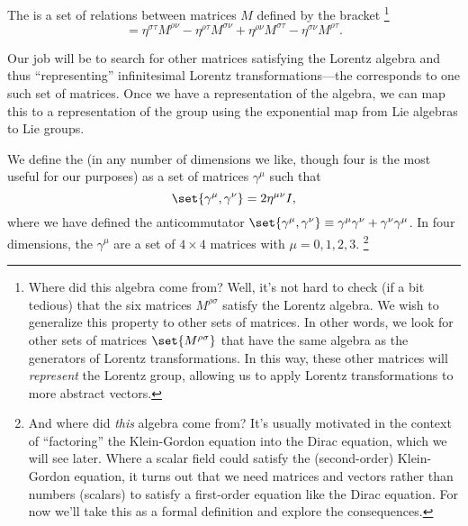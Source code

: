 \begin{defn}
The  is a set of relations between matrices $M$ defined by the bracket%
    \footnote{Where did this algebra come from? Well, it's not hard to check (if a bit tedious) that the six matrices $M^{\rho\sigma}$ satisfy the Lorentz algebra. We wish to generalize this property to other sets of matrices. In other words, we look for other sets of matrices $\set{M^{\rho\sigma}}$ that have the same algebra as the generators of Lorentz transformations. In this way, these other matrices will \emph{represent} the Lorentz group, allowing us to apply Lorentz transformations to more abstract vectors.}
\begin{equation}
    [M^{\rho\sigma},M^{\tau\nu}]=\eta^{\sigma\tau}M^{\rho\nu}-\eta^{\rho\tau}M^{\sigma\nu}+\eta^{\rho\nu}M^{\sigma\tau}-\eta^{\sigma\nu}M^{\rho\tau}.
\end{equation}
\end{defn}

Our job will be to search for other matrices satisfying the Lorentz algebra and thus ``representing'' infinitesimal Lorentz transformations---the  corresponds to one such set of matrices. Once we have a representation of the algebra, we can map this to a representation of the group using the exponential map from Lie algebras to Lie groups.
\begin{defn}
We define the  (in any number of dimensions we like, though four is the most useful for our purposes) as a set of matrices $\gamma^\mu$ such that
$$\set{\gamma^\mu,\gamma^\nu}=2\eta^{\mu\nu} I,$$
where we have defined the anticommutator $\set{\gamma^\mu,\gamma^\nu}\equiv\gamma^\mu \gamma^\nu+\gamma^\nu\gamma^\mu$. In four dimensions, the $\gamma^\mu$ are a set of $4\times 4$ matrices with $\mu=0,1,2,3$.%
    \footnote{And where did \emph{this} algebra come from? It's usually motivated in the context of ``factoring'' the Klein-Gordon equation into the Dirac equation, which we will see later. Where a scalar field could satisfy the (second-order) Klein-Gordon equation, it turns out that we need matrices and vectors rather than numbers (scalars) to satisfy a first-order equation like the Dirac equation. For now we'll take this as a formal definition and explore the consequences.}
\end{defn}

